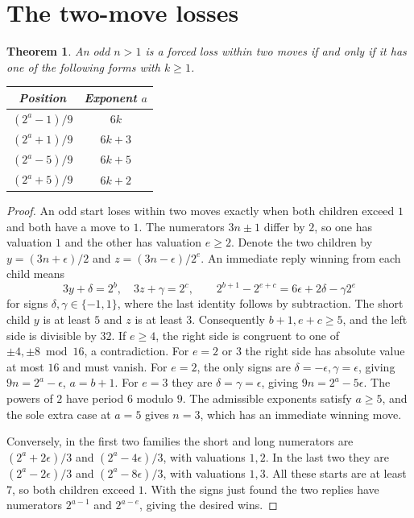 \documentclass[11pt]{article}
\newtheorem{theorem}{Theorem}
\begin{document}
\section{The two-move losses}

\begin{theorem}\label{thm:two}
An odd \(n>1\) is a forced loss within two moves if and only if it has one of the following forms with \(k\ge1\).
\begin{center}
\begin{tabular}{@{}cc@{}}\toprule
Position & Exponent \(a\)\\\midrule
\((2^a-1)/9\) & \(6k\)\\
\((2^a+1)/9\) & \(6k+3\)\\
\((2^a-5)/9\) & \(6k+5\)\\
\((2^a+5)/9\) & \(6k+2\)\\\bottomrule
\end{tabular}
\end{center}
\end{theorem}

\begin{proof}
An odd start loses within two moves exactly when both children exceed \(1\) and both have a move to \(1\). The numerators \(3n\pm1\) differ by \(2\), so one has valuation \(1\) and the other has valuation \(e\ge2\). Denote the two children by \(y=(3n+\epsilon)/2\) and \(z=(3n-\epsilon)/2^e\). An immediate reply winning from each child means
\[
 3y+\delta=2^b,\quad 3z+\gamma=2^c,\qquad
 2^{b+1}-2^{e+c}=6\epsilon+2\delta-\gamma 2^e
\]
for signs \(\delta,\gamma\in\{-1,1\}\), where the last identity follows by subtraction. The short child \(y\) is at least \(5\) and \(z\) is at least \(3\). Consequently \(b+1,e+c\ge5\), and the left side is divisible by \(32\). If \(e\ge4\), the right side is congruent to one of \(\pm4,\pm8\bmod16\), a contradiction. For \(e=2\) or \(3\) the right side has absolute value at most \(16\) and must vanish. For \(e=2\), the only signs are \(\delta=-\epsilon,\gamma=\epsilon\), giving \(9n=2^a-\epsilon\), \(a=b+1\). For \(e=3\) they are \(\delta=\gamma=\epsilon\), giving \(9n=2^a-5\epsilon\). The powers of \(2\) have period \(6\) modulo \(9\). The admissible exponents satisfy \(a\ge5\), and the sole extra case at \(a=5\) gives \(n=3\), which has an immediate winning move.

Conversely, in the first two families the short and long numerators are \((2^a+2\epsilon)/3\) and \((2^a-4\epsilon)/3\), with valuations \(1,2\). In the last two they are \((2^a-2\epsilon)/3\) and \((2^a-8\epsilon)/3\), with valuations \(1,3\). All these starts are at least \(7\), so both children exceed \(1\). With the signs just found the two replies have numerators \(2^{a-1}\) and \(2^{a-e}\), giving the desired wins.
\end{proof}
\end{document}
